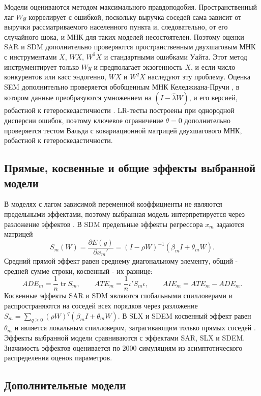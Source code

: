 \documentclass[12pt, a4paper]{article}
\begin{document}
Модели оцениваются методом максимального правдоподобия. Пространственный лаг $Wy$ коррелирует с
ошибкой, поскольку выручка соседей сама зависит от выручки рассматриваемого населенного пункта и,
следовательно, от его случайного шока, и МНК для таких моделей несостоятелен. Поэтому оценки SAR и
SDM дополнительно проверяются пространственным двухшаговым МНК с инструментами $X$, $WX$, $W^2 X$
\cite{kelejian1998} и стандартными ошибками Уайта. Этот метод инструментирует только $Wy$ и
предполагает экзогенность $X$, и если число конкурентов или касс эндогенно, $WX$ и $W^2 X$
наследуют эту проблему. Оценка SEM дополнительно проверяется обобщенным МНК Келеджиана-Пручи
\cite{kelejian1999}, в котором данные преобразуются умножением на $(I - \hat{\lambda} W)$, и его
версией, робастной к гетероскедастичности \cite{kelejian2010}. LR-тесты построены при однородной
дисперсии ошибок, поэтому ключевое ограничение $\theta = 0$ дополнительно проверяется тестом
Вальда с ковариационной матрицей двухшагового МНК, робастной к гетероскедастичности.

\subsection*{Прямые, косвенные и общие эффекты выбранной модели}

В моделях с лагом зависимой переменной коэффициенты не являются предельными эффектами, поэтому
выбранная модель интерпретируется через разложение эффектов \cite{lesage2009}. В SDM предельные
эффекты регрессора $x_m$ задаются матрицей
\[
S_m(W) = \frac{\partial E(y)}{\partial x_m'} = (I - \rho W)^{-1} (\beta_m I + \theta_m W).
\]
\indent Средний прямой эффект равен среднему диагональному элементу, общий - средней сумме строки,
косвенный - их разнице:
\[
ADE_m = \frac{1}{n} \operatorname{tr} S_m, \qquad
ATE_m = \frac{1}{n} \iota' S_m \iota, \qquad
AIE_m = ATE_m - ADE_m.
\]
\indent Косвенные эффекты SAR и SDM являются глобальными спилловерами и распространяются на
соседей всех порядков через разложение $S_m = \sum_{q \ge 0} (\rho W)^q (\beta_m I + \theta_m W)$.
В SLX и SDEM косвенный эффект равен $\theta_m$ и является локальным спилловером, затрагивающим
только прямых соседей \cite{vega2015}. Эффекты выбранной модели сравниваются с эффектами SAR, SLX
и SDEM. Значимость эффектов оценивается по 2000 симуляциям из асимптотического распределения
оценок параметров.

\subsection*{Дополнительные модели}
\end{document}
